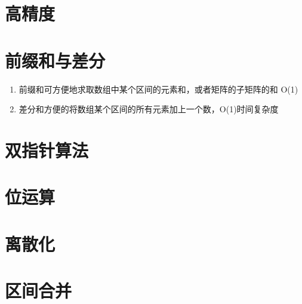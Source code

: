 \section{高精度}

\section{前缀和与差分}
\begin{enumerate}
    \item 前缀和可方便地求取数组中某个区间的元素和，或者矩阵的子矩阵的和 O(1)
    \item 差分和方便的将数组某个区间的所有元素加上一个数，O(1)时间复杂度
\end{enumerate}

\section{双指针算法}


\section{位运算}


\section{离散化}


\section{区间合并}